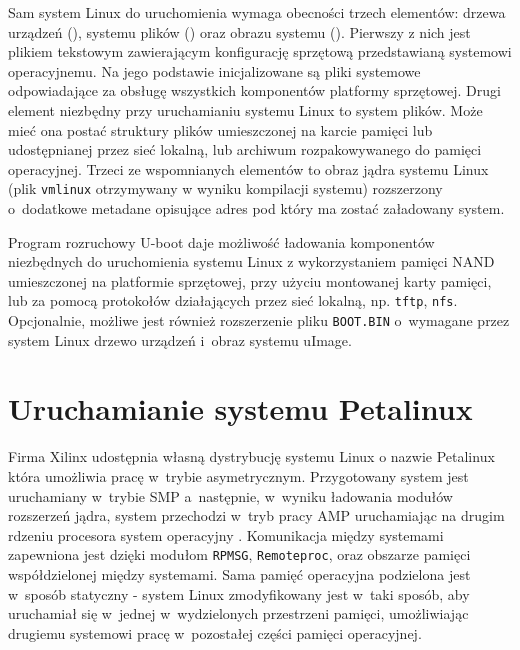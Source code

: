   Sam system Linux do uruchomienia wymaga obecności trzech elementów: drzewa urządzeń (), systemu plików () oraz obrazu systemu (). Pierwszy z nich jest plikiem tekstowym zawierającym konfigurację sprzętową przedstawianą systemowi operacyjnemu. Na jego podstawie inicjalizowane są pliki systemowe odpowiadające za obsługę wszystkich komponentów platformy sprzętowej. Drugi element niezbędny przy uruchamianiu systemu Linux to system plików. Może mieć ona postać struktury plików umieszczonej na karcie pamięci lub udostępnianej przez sieć lokalną, lub archiwum rozpakowywanego do pamięci operacyjnej. Trzeci ze wspomnianych elementów to obraz jądra systemu Linux (plik \texttt{vmlinux} otrzymywany w wyniku kompilacji systemu) rozszerzony o~dodatkowe metadane opisujące adres pod który ma zostać załadowany system. 
  
  Program rozruchowy U-boot daje możliwość ładowania komponentów niezbędnych do uruchomienia systemu Linux z wykorzystaniem pamięci NAND umieszczonej na platformie sprzętowej, przy użyciu montowanej karty pamięci, lub za pomocą protokołów działających przez sieć lokalną, np. \texttt{tftp}, \texttt{nfs}. Opcjonalnie, możliwe jest również rozszerzenie pliku \texttt{BOOT.BIN} o~wymagane przez system Linux drzewo urządzeń i~obraz systemu uImage.
  
  
  
  
  
 \section{Uruchamianie systemu Petalinux} 
  \label{sec:uruchamianie_systemu_petalinux}
  
  Firma Xilinx udostępnia własną dystrybucję systemu Linux o nazwie Petalinux która umożliwia pracę w~trybie asymetrycznym\cite{petaUG}. Przygotowany system jest uruchamiany w~trybie SMP a~następnie, w~wyniku ładowania modułów rozszerzeń jądra, system przechodzi w~tryb pracy AMP uruchamiając na drugim rdzeniu procesora system operacyjny . Komunikacja między systemami zapewniona jest dzięki modułom \texttt{RPMSG}, \texttt{Remoteproc}, oraz obszarze pamięci współdzielonej między systemami. Sama pamięć operacyjna podzielona jest w~sposób statyczny - system Linux zmodyfikowany jest w~taki sposób, aby uruchamiał się w~jednej w~wydzielonych przestrzeni pamięci, umożliwiając drugiemu systemowi pracę w~pozostałej części pamięci operacyjnej. 
  
